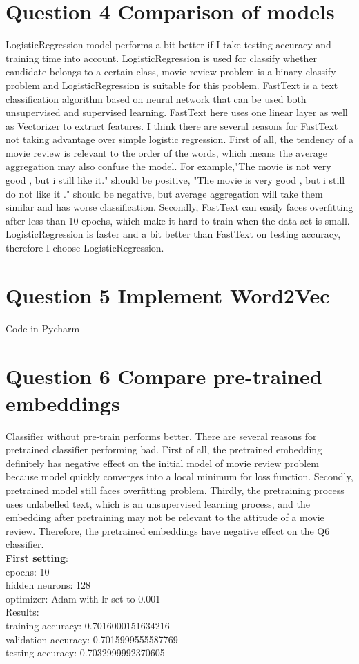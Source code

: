 \documentclass{article} %
\begin{document}
\section*{Question 4 Comparison of models}
LogisticRegression model performs a bit better if I take testing accuracy and training time into account. LogisticRegression is used for classify 
whether candidate belongs to a certain class, movie review problem is a binary 
classify problem and LogisticRegression is suitable for this problem. 
FastText is a text classification algorithm based on neural network that can be used both unsupervised and 
supervised learning. FastText here uses one linear layer as well as Vectorizer
to extract features. I think there are several reasons for FastText not taking advantage 
over simple logistic regression. First of all, the tendency of a movie review is 
relevant to the order of the words, which means the average aggregation may also confuse the 
model. For example,"The movie is not very good , but i still like it." should be positive, 
"The movie is very good , but i still do not like it ." should be negative, but average 
aggregation will take them similar and has worse classification. Secondly, FastText can easily 
faces overfitting after less than 10 epochs, which make it hard to train when the data set is small.
LogisticRegression is faster and a bit better than FastText on testing accuracy, therefore I choose LogisticRegression.


\section*{Question 5 Implement Word2Vec}
Code in Pycharm

\section*{Question 6 Compare pre-trained embeddings}
Classifier without pre-train performs better. There are several reasons for 
pretrained classifier performing bad. First of all, the pretrained embedding 
definitely has negative effect on the initial model of movie review problem because 
model quickly converges into a local minimum for loss function. Secondly, 
pretrained model still faces overfitting problem. Thirdly, the pretraining process 
uses unlabelled text, which is an unsupervised learning process, and the embedding after 
pretraining may not be relevant to the attitude of a movie review. Therefore, 
the pretrained embeddings have negative effect on the Q6 classifier.
\\
\textbf{First setting}:\\
epochs: 10\\
hidden neurons: 128\\
optimizer: Adam with lr set to 0.001\\
Results:\\
training accuracy: 0.7016000151634216\\
validation accuracy: 0.7015999555587769\\
testing accuracy: 0.7032999992370605\\
\end{document}
